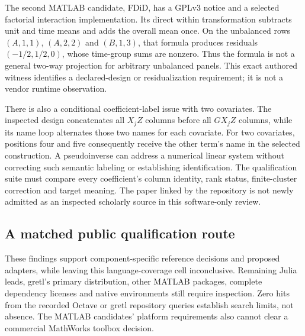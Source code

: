 The second MATLAB candidate, FDiD, has a GPLv3 notice and a selected factorial
interaction implementation. Its direct within transformation subtracts unit
and time means and adds the overall mean once. On the unbalanced rows
$(A,1,1)$, $(A,2,2)$ and $(B,1,3)$, that formula produces residuals
$(-1/2,1/2,0)$, whose time-group sums are nonzero. Thus the formula is not
a general two-way projection for arbitrary unbalanced panels. This exact
authored witness identifies a declared-design or residualization requirement;
it is not a vendor runtime observation.~\citep{exec25_panelother_matlab,exec25_panelother_choice}

There is also a conditional coefficient-label issue with two covariates.
The inspected design concatenates all $X_jZ$ columns before all $GX_jZ$
columns, while its name loop alternates those two names for each covariate.
For two covariates, positions four and five consequently receive the other
term's name in the selected construction. A pseudoinverse can address a
numerical linear system without correcting such semantic labeling or
establishing identification. The qualification suite must compare every
coefficient's column identity, rank status, finite-cluster correction and
target meaning. The paper linked by the repository is not newly admitted
as an inspected scholarly source in this software-only review.
\citep{exec25_panelother_matlab,exec25_panelother_choice}

\subsection{A matched public qualification route}
These findings support component-specific reference decisions and proposed
adapters, while leaving this language-coverage cell inconclusive. Remaining
Julia leads, gretl's primary distribution, other MATLAB packages, complete
dependency licenses and native environments still require inspection.
Zero hits from the recorded Octave or gretl repository queries establish
search limits, not absence. The MATLAB candidates' platform requirements
also cannot clear a commercial MathWorks toolbox decision.
\citep{exec25_panelother_choice}

